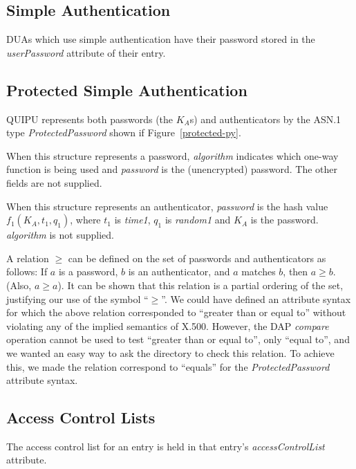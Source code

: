 \subsection{Simple Authentication}

DUAs which use simple authentication have their password stored in the
{\em userPassword} attribute of their entry.

\subsection{Protected Simple Authentication}

QUIPU represents both passwords (the $K_{A}$s) and authenticators by the
ASN.1 type {\em ProtectedPassword} shown if Figure~\ref{protected-py}.

When this structure represents a password,
{\em algorithm} indicates which one-way function is being used and
{\em password} is the (unencrypted) password. The other fields are
not supplied.

When this structure represents an authenticator, {\em password}
is the hash value 
\begin{math}
f_{1}(K_{A}, t_{1}, q_{1})
\end{math},
where $t_{1}$ is {\em time1}, $q_{1}$ is {\em random1} and 
$K_A$ is the password. {\em algorithm} is not supplied.

A relation $\geq$ can be defined on the set of passwords and
authenticators as follows: If $a$ is a password, $b$ is an authenticator,
and $a$ matches $b$, then $a \geq b$. (Also, $a \geq a$). It can be shown
that this relation
is a partial ordering of the set, justifying our use of the symbol ``$\geq$''.
We could have defined an attribute syntax for which the above relation corresponded
to ``greater than or equal to'' without violating any of the implied semantics
of X.500. However, the DAP {\em compare} operation cannot be used to test 
``greater than or equal to'', only ``equal to'', and we wanted an easy
way to ask the 
directory to check this relation. To achieve this, we made the relation
correspond to ``equals'' for the {\em ProtectedPassword} attribute syntax.


\subsection{Access Control Lists}

The access control list for an entry is held in that entry's
{\em accessControlList} attribute.


